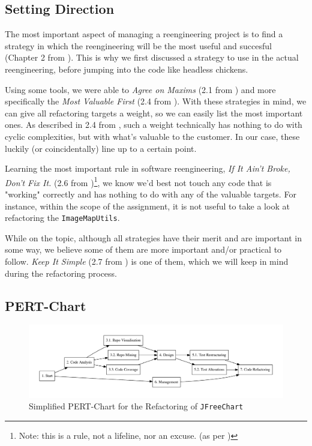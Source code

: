 \documentclass[11pt]{article}
\begin{document}
	\subsection{Setting Direction}
	The most important aspect of managing a reengineering project is to find a strategy in which the reengineering will be the most useful and succesful (Chapter 2 from \cite{demeyer2009object}). This is why we first discussed a strategy to use in the actual reengineering, before jumping into the code like headless chickens.
	
	Using some tools, we were able to \textsl{Agree on Maxims} (2.1 from \cite{demeyer2009object}) and more specifically the \textsl{Most Valuable First} (2.4 from \cite{demeyer2009object}). With these strategies in mind, we can give all refactoring targets a weight, so we can easily list the most important ones. As described in 2.4 from \cite{demeyer2009object}, such a weight technically has nothing to do with cyclic complexities, but with what's valuable to the customer. In our case, these luckily (or coincidentally) line up to a certain point.
	
	Learning the most important rule in software reengineering,
	\textsl{If It Ain't Broke, Don't Fix It.} (2.6 from \cite{demeyer2009object})\footnote{Note: this is a rule, not a lifeline, nor an excuse. (as per \cite{demeyer2009object})}, we know we'd best not touch any code that is "working" correctly and has nothing to do with any of the valuable targets. For instance, within the scope of the assignment, it is not useful to take a look at refactoring the \texttt{ImageMapUtils}.
	
	While on the topic, although all strategies have their merit and are important in some way, we believe some of them are more important and/or practical to follow. \textsl{Keep It Simple} (2.7 from \cite{demeyer2009object}) is one of them, which we will keep in mind during the refactoring process.
	
	\subsection{PERT-Chart} 
	\begin{figure}[H] 
		\centering 
		\includegraphics[width=\textwidth]{pert.pdf}
		\caption{Simplified PERT-Chart for the Refactoring of \texttt{JFreeChart}} 
		\label{fig:pert} 
	\end{figure} 
   
\end{document}

